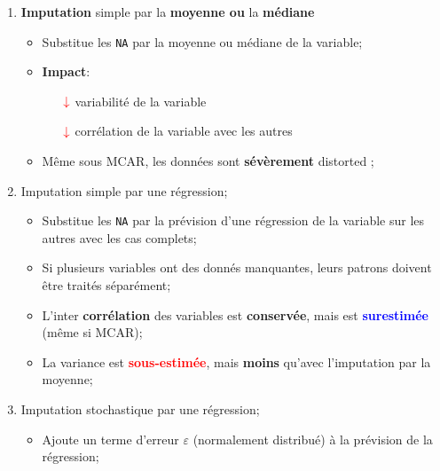 \documentclass[10pt, french]{article}
\begin{document}
\begin{multicols*}{3}
\begin{enumerate}
\begin{itemize}
		\end{itemize}
	\item	\textbf{Imputation} simple par la \textbf{moyenne ou} la \textbf{médiane}
		\begin{itemize}
		\item	Substitue les \texttt{NA} par la moyenne ou médiane de la variable;
		\item	\textbf{Impact}:
			\begin{itemize}
			\item[$\color{red}\downarrow$]	variabilité de la variable	\\
			\item[$\color{red}\downarrow$]	corrélation de la variable avec les autres	\\
			\end{itemize}
		\item	Même sous MCAR, les données sont \textbf{sévèrement} \og distorted \fg{};
		\end{itemize}
	\item	Imputation simple par une régression;
		\begin{itemize}
		\item	Substitue les \texttt{NA} par la prévision d'une régression de la variable sur les autres avec les cas complets;
		\item	Si plusieurs variables ont des donnés manquantes, leurs patrons doivent être traités séparément;
		\item	L'inter \textbf{corrélation} des variables est \textbf{conservée}, mais est \textcolor{blue}{\textbf{surestimée}} (même si MCAR);
		\item	La variance est \textcolor{red}{\textbf{sous-estimée}}, mais \textbf{moins} qu'avec l'imputation par la moyenne;
		\end{itemize}
	\item	Imputation stochastique par une régression;
		\begin{itemize}
		\item	Ajoute un terme d'erreur $\varepsilon$ (normalement distribué) à la prévision de la régression;

\end{itemize}
\end{enumerate}
\end{multicols*}
\end{document}
